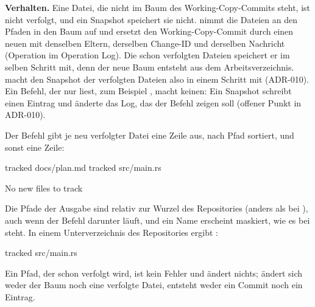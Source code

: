 {\bf Verhalten.} Eine Datei, die nicht im Baum des Working-Copy-Commits steht,
ist nicht verfolgt, und ein Snapshot speichert sie nicht.  nimmt
die Dateien an den Pfaden in den Baum auf und ersetzt den Working-Copy-Commit durch
einen neuen mit denselben Eltern, derselben Change-ID und derselben
Nachricht (Operation  im Operation Log). Die schon verfolgten Dateien
speichert er im selben Schritt mit, denn der neue Baum entsteht aus dem Arbeitsverzeichnis.
 macht den Snapshot der verfolgten Dateien also in einem Schritt
mit (ADR-010). Ein Befehl, der nur liest, zum Beispiel , macht keinen:
Ein Snapshot schreibt einen Eintrag und änderte das Log, das der Befehl zeigen
soll (offener Punkt in ADR-010).

Der Befehl gibt je neu verfolgter Datei eine Zeile aus, nach Pfad sortiert, und sonst eine Zeile:

\starttyping
tracked docs/plan.md
tracked src/main.rs
\stoptyping

\starttyping
No new files to track
\stoptyping

Die Pfade der Ausgabe sind relativ zur Wurzel des Repositories (anders als bei ),
auch wenn der Befehl darunter läuft, und ein Name erscheint maskiert, wie es bei 
steht. In einem Unterverzeichnis  des Repositories ergibt :

\starttyping
tracked src/main.rs
\stoptyping

Ein Pfad, der schon verfolgt wird,
ist kein Fehler und ändert nichts; ändert sich weder der Baum noch eine verfolgte Datei,
entsteht weder ein Commit noch ein Eintrag.

